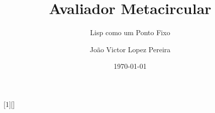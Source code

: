 
\usepackage[brazilian]{babel}
\usepackage[utf8]{inputenc}
\usepackage[T1]{fontenc}
\usepackage{graphicx}
\usepackage{float}
\usepackage{geometry}
\geometry{left=0.4cm, right=0.4cm}
\usepackage{csquotes}
\usepackage{amsmath, amssymb}
\usepackage{upquote}
\usepackage{listings}
\usepackage{hyperref}

\usepackage[style=numeric, backend=biber]{biblatex}

\graphicspath{{figures/}}

[1][]{
  \lstset{
    basicstyle=\ttfamily,
    columns=flexible,
    breaklines=true,
    breakatwhitespace=true,
    frame=none,
    basewidth=0.5em,
    aboveskip=13pt,
    belowskip=0pt,
    #1
  }
}{}

\newcommand{\excerptpage}[2]{
  \begin{center}
    \textit{#1}\\
        --- #2.
  \end{center}
}

\newcommand{\var}[1]{\texttt{#1}}

\title{Avaliador Metacircular}
\subtitle{Lisp como um Ponto Fixo}
\author{João Victor Lopez Pereira}
\date{\today}
